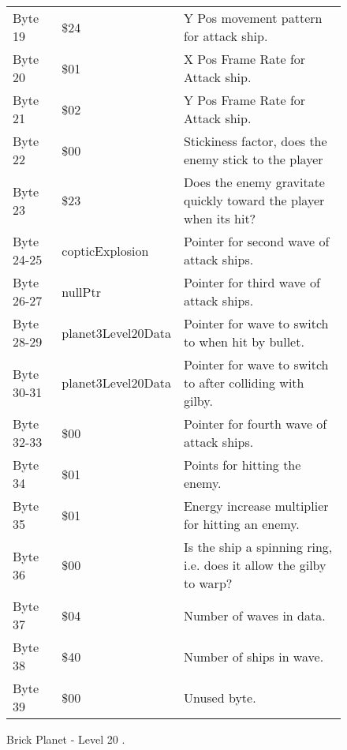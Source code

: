 \begin{figure}[H]
{\begin{adjustbox}{width=12cm}
\begin{tabular}{lll}
 Byte 19    & \$24                & Y Pos movement pattern for attack ship.                             \\
 Byte 20    & \$01                & X Pos Frame Rate for Attack ship.                                   \\
 Byte 21    & \$02                & Y Pos Frame Rate for Attack ship.                                   \\
 Byte 22    & \$00                & Stickiness factor, does the enemy stick to the player               \\
 Byte 23    & \$23                & Does the enemy gravitate quickly toward the player when its hit?    \\
 Byte 24-25 & copticExplosion    & Pointer for second wave of attack ships.                            \\
 Byte 26-27 & nullPtr            & Pointer for third wave of attack ships.                             \\
 Byte 28-29 & planet3Level20Data & Pointer for wave to switch to when hit by bullet.                   \\
 Byte 30-31 & planet3Level20Data & Pointer for  wave to switch to after colliding with gilby.          \\
 Byte 32-33 & \$00                & Pointer for fourth wave of attack ships.                            \\
 Byte 34    & \$01                & Points for hitting the enemy.                                       \\
 Byte 35    & \$01                & Energy increase multiplier for hitting an enemy.                    \\
 Byte 36    & \$00                & Is the ship a spinning ring, i.e. does it allow the gilby to warp?  \\
 Byte 37    & \$04                & Number of waves in data.                                            \\
 Byte 38    & \$40                & Number of ships in wave.                                            \\
 Byte 39    & \$00                & Unused byte.                                                        \\
\bottomrule
\end{tabular}

  \end{adjustbox}

  }\caption*{Brick Planet - Level 20
.}
\end{figure}

